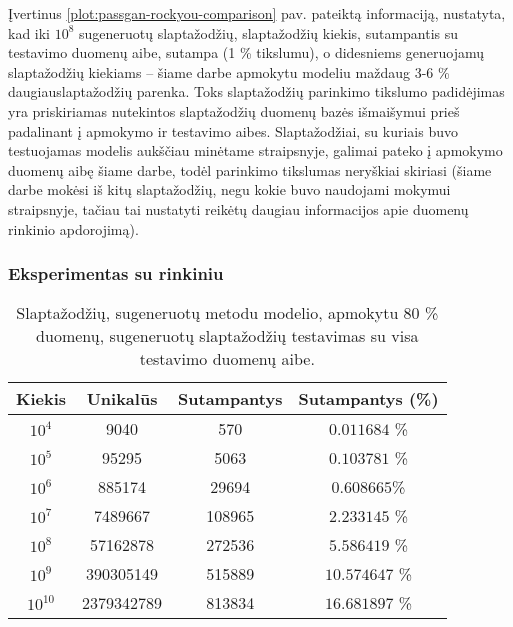 \documentclass{VUMIFInfBakalaurinis}
\begin{document}
Įvertinus \ref{plot:passgan-rockyou-comparison} pav. pateiktą informaciją, 
nustatyta, kad iki $10^8$ sugeneruotų slaptažodžių, slaptažodžių kiekis, 
sutampantis su testavimo duomenų aibe, sutampa (1 \% tikslumu), o didesniems 
generuojamų slaptažodžių kiekiams -- šiame darbe apmokytu modeliu maždaug 3-6 \% 
daugiauslaptažodžių parenka. Toks slaptažodžių parinkimo tikslumo padidėjimas 
yra priskiriamas nutekintos slaptažodžių duomenų bazės  
išmaišymui prieš padalinant į apmokymo ir testavimo aibes. Slaptažodžiai, su 
kuriais buvo testuojamas modelis aukščiau minėtame straipsnyje, galimai pateko į 
apmokymo duomenų aibę šiame darbe, todėl parinkimo tikslumas neryškiai skiriasi 
(šiame darbe mokėsi iš kitų slaptažodžių, negu kokie buvo naudojami mokymui 
straipsnyje, tačiau tai nustatyti reikėtų daugiau informacijos apie duomenų 
rinkinio apdorojimą).

\subsubsection{Eksperimentas su  rinkiniu} %
\begin{table}[hb]
  \centering
  \caption{
    Slaptažodžių, sugeneruotų  metodu modelio, apmokytu 80 \% 
     duomenų, sugeneruotų slaptažodžių testavimas su visa
     testavimo duomenų aibe.
  }
  \begin{tabular}{|c|c|c|c|}
    \hline \textbf{Kiekis} & \textbf{Unikalūs} & \textbf{Sutampantys} & 
    \textbf{Sutampantys (\%)} \\
    \hline $10^4$ & 9040 & 570 & $0.011684$ \% \\
    \hline $10^5$ & 95295 & 5063 & $0.103781$ \% \\
    \hline $10^6$ & 885174 & 29694 & $0.608665$\% \\
    \hline $10^7$ & 7489667 & 108965 & $2.233145$ \% \\
    \hline $10^8$ & 57162878 & 272536 & $5.586419$ \% \\
    \hline $10^9$ & 390305149 & 515889 & $10.574647$ \% \\
    \hline $10^{10}$ & 2379342789 & 813834 & $16.681897$ \% \\
    \hline
  \end{tabular}
  \label{tab:passgan-linkedin-results}
\end{table}
\end{document}
